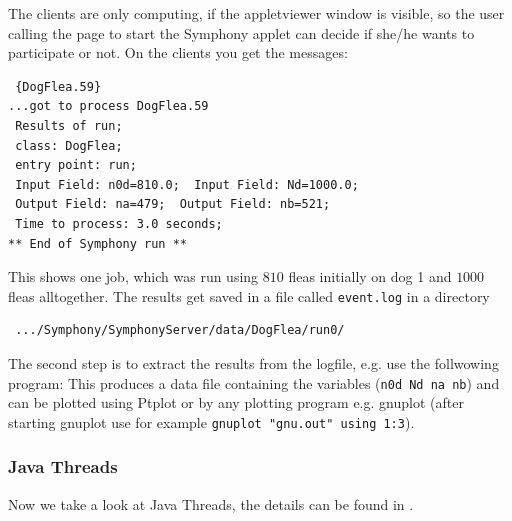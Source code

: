The clients are only computing, if the appletviewer window is visible, so
the user calling the page to start the Symphony applet can decide if she/he
wants to participate or not. On the clients you get the messages:
\begin{small}
\begin{verbatim}
 {DogFlea.59} 
...got to process DogFlea.59
 Results of run; 
 class: DogFlea; 
 entry point: run;  
 Input Field: n0d=810.0;  Input Field: Nd=1000.0; 
 Output Field: na=479;  Output Field: nb=521; 
 Time to process: 3.0 seconds;  
** End of Symphony run **   
\end{verbatim} 
\end{small}
This shows one job, which was run using $810$ fleas initially on dog 1 and
$1000$ fleas alltogether. The results get saved in a file called \verb|event.log|
in a directory 
\begin{verbatim}
 .../Symphony/SymphonyServer/data/DogFlea/run0/ 
\end{verbatim}
The second step is to extract the results from the logfile, e.g. use the
follwowing program:
This produces a data file containing the variables (\verb|n0d Nd na nb|) 
and can be plotted using Ptplot or by any plotting program e.g. gnuplot (after 
starting gnuplot use for example \verb|gnuplot "gnu.out" using 1:3|).


\subsubsection{Java Threads}
Now we take a look at Java Threads, the details can be found in
\cite[]{JavaThreads}. 

